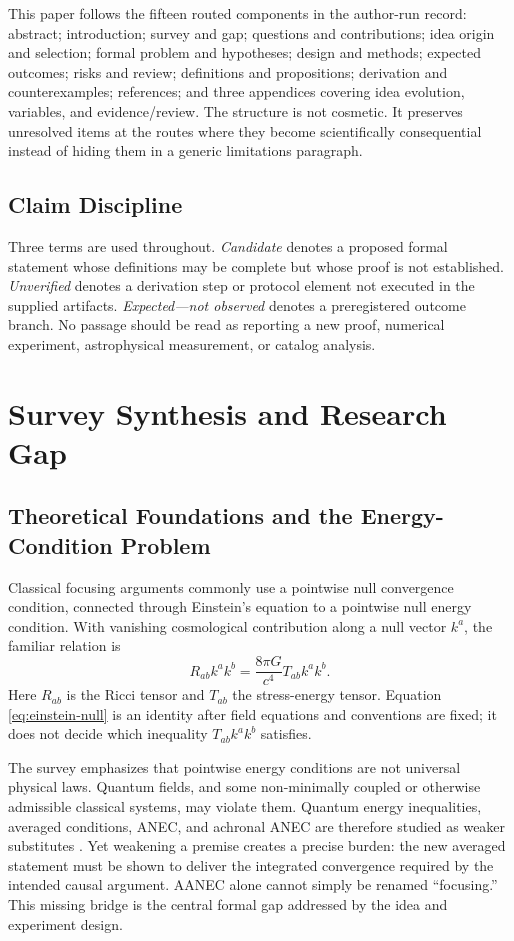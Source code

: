 \documentclass[conference]{IEEEtran}
\begin{document}
This paper follows the fifteen routed components in the author-run record: abstract; introduction; survey and gap; questions and contributions; idea origin and selection; formal problem and hypotheses; design and methods; expected outcomes; risks and review; definitions and propositions; derivation and counterexamples; references; and three appendices covering idea evolution, variables, and evidence/review. The structure is not cosmetic. It preserves unresolved items at the routes where they become scientifically consequential instead of hiding them in a generic limitations paragraph.

\subsection{Claim Discipline}
Three terms are used throughout. \emph{Candidate} denotes a proposed formal statement whose definitions may be complete but whose proof is not established. \emph{Unverified} denotes a derivation step or protocol element not executed in the supplied artifacts. \emph{Expected---not observed} denotes a preregistered outcome branch. No passage should be read as reporting a new proof, numerical experiment, astrophysical measurement, or catalog analysis.

\section{Survey Synthesis and Research Gap}
\label{sec:survey}

\subsection{Theoretical Foundations and the Energy-Condition Problem}
Classical focusing arguments commonly use a pointwise null convergence condition, connected through Einstein's equation to a pointwise null energy condition. With vanishing cosmological contribution along a null vector $k^a$, the familiar relation is
\begin{equation}
R_{ab}k^ak^b=\frac{8\pi G}{c^4}T_{ab}k^ak^b.
\label{eq:einstein-null}
\end{equation}
Here $R_{ab}$ is the Ricci tensor and $T_{ab}$ the stress-energy tensor. Equation \eqref{eq:einstein-null} is an identity after field equations and conventions are fixed; it does not decide which inequality $T_{ab}k^ak^b$ satisfies.

The survey emphasizes that pointwise energy conditions are not universal physical laws. Quantum fields, and some non-minimally coupled or otherwise admissible classical systems, may violate them. Quantum energy inequalities, averaged conditions, ANEC, and achronal ANEC are therefore studied as weaker substitutes \cite{kontou2020}. Yet weakening a premise creates a precise burden: the new averaged statement must be shown to deliver the integrated convergence required by the intended causal argument. AANEC alone cannot simply be renamed ``focusing.'' This missing bridge is the central formal gap addressed by the idea and experiment design.
\end{document}
